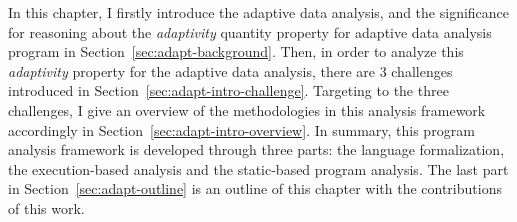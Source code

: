 
In this chapter, 
I firstly introduce the adaptive data analysis, and the
significance for reasoning about the \emph{adaptivity} quantity property 
for adaptive data analysis program in Section~\ref{sec:adapt-background}.
Then, in order to analyze this \emph{adaptivity} property for the adaptive data analysis, there are 3 challenges
introduced in Section~\ref{sec:adapt-intro-challenge}.
Targeting to the three challenges, I give an overview of the methodologies in this analysis framework accordingly
in Section~\ref{sec:adapt-intro-overview}.
In summary, this program analysis framework is developed through three parts:
the language formalization,
the execution-based analysis and the static-based program analysis.
The last part in Section~\ref{sec:adapt-outline} is an outline of this chapter with the contributions of this work.



